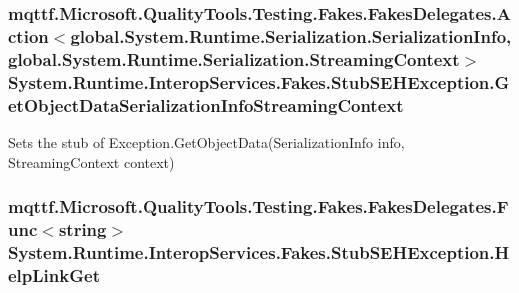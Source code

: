\hypertarget{class_system_1_1_runtime_1_1_interop_services_1_1_fakes_1_1_stub_s_e_h_exception_a73fe312044aa8b2667d064e58db0a8f1}{
\subsubsection[{Get\-Object\-Data\-Serialization\-Info\-Streaming\-Context}]{\setlength{\rightskip}{0pt plus 5cm}mqttf.\-Microsoft.\-Quality\-Tools.\-Testing.\-Fakes.\-Fakes\-Delegates.\-Action$<$global.\-System.\-Runtime.\-Serialization.\-Serialization\-Info, global.\-System.\-Runtime.\-Serialization.\-Streaming\-Context$>$ System.\-Runtime.\-Interop\-Services.\-Fakes.\-Stub\-S\-E\-H\-Exception.\-Get\-Object\-Data\-Serialization\-Info\-Streaming\-Context}}\label{class_system_1_1_runtime_1_1_interop_services_1_1_fakes_1_1_stub_s_e_h_exception_a73fe312044aa8b2667d064e58db0a8f1}


Sets the stub of Exception.\-Get\-Object\-Data(\-Serialization\-Info info, Streaming\-Context context)

\hypertarget{class_system_1_1_runtime_1_1_interop_services_1_1_fakes_1_1_stub_s_e_h_exception_a175850ed1c51444abd637c04829f641c}{
\subsubsection[{Help\-Link\-Get}]{\setlength{\rightskip}{0pt plus 5cm}mqttf.\-Microsoft.\-Quality\-Tools.\-Testing.\-Fakes.\-Fakes\-Delegates.\-Func$<$string$>$ System.\-Runtime.\-Interop\-Services.\-Fakes.\-Stub\-S\-E\-H\-Exception.\-Help\-Link\-Get}}\label{class_system_1_1_runtime_1_1_interop_services_1_1_fakes_1_1_stub_s_e_h_exception_a175850ed1c51444abd637c04829f641c}


